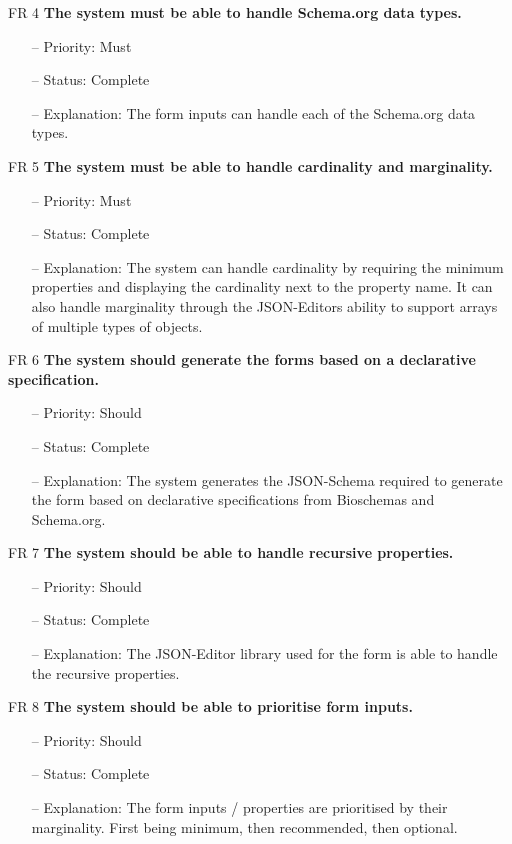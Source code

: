 \newpage
\noindent
FR 4 \textbf{The system must be able to handle Schema.org data types.}
\begin{itemize}
\item[--] Priority: Must
\item[--] Status: Complete
\item[--] Explanation: The form inputs can handle each of the Schema.org data types.
\end{itemize}
\noindent
FR 5 \textbf{The system must be able to handle cardinality and marginality.}
\begin{itemize}
\item[--] Priority: Must
\item[--] Status: Complete
\item[--] Explanation: The system can handle cardinality by requiring the minimum properties and displaying the cardinality next to the property name. It can also handle marginality through the JSON-Editors ability to support arrays of multiple types of objects.
\end{itemize}
\noindent
FR 6 \textbf{The system should generate the forms based on a declarative specification.}
\begin{itemize}
\item[--] Priority: Should
\item[--] Status: Complete
\item[--] Explanation: The system generates the JSON-Schema required to generate the form based on declarative specifications from Bioschemas and Schema.org. 
\end{itemize}
\noindent
FR 7 \textbf{The system should be able to handle recursive properties.}
\begin{itemize}
\item[--] Priority: Should
\item[--] Status: Complete
\item[--] Explanation: The JSON-Editor library used for the form is able to handle the recursive properties.
\end{itemize}
\noindent
FR 8 \textbf{The system should be able to prioritise form inputs.}
\begin{itemize}
\item[--] Priority: Should
\item[--] Status: Complete
\item[--] Explanation: The form inputs / properties are prioritised by their marginality. First being minimum, then recommended, then optional. 
\end{itemize}

